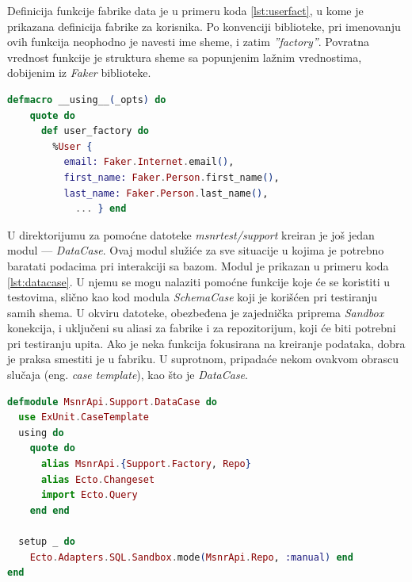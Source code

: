 \documentclass[12pt,oneside]{memoir}
\begin{document}
\par Definicija funkcije fabrike data je u primeru koda \ref{lst:userfact}, u kome je prikazana definicija fabrike za korisnika. Po konvenciji biblioteke, pri imenovanju ovih funkcija neophodno je navesti ime sheme, i zatim \emph{''{\textunderscore}factory''}. Povratna vrednost funkcije je struktura sheme sa popunjenim lažnim vrednostima, dobijenim iz \emph{Faker} biblioteke. \\

\begin{minipage}{\linewidth}
\begin{lstlisting}[language=elixir, basicstyle=\small, caption={Definicija modula \emph{UserFactory}},captionpos=b, label={lst:userfact}]
  defmacro __using__(_opts) do
    quote do
      def user_factory do
        %User {
          email: Faker.Internet.email(),
          first_name: Faker.Person.first_name(),
          last_name: Faker.Person.last_name(),
         	... } end
\end{lstlisting}
\end{minipage}

\par U direktorijumu za pomoćne datoteke \emph{msnr{\textunderscore}test/support} kreiran je još jedan modul --- \emph{DataCase}. Ovaj modul služiće za sve situacije u kojima je potrebno baratati podacima pri interakciji sa bazom. Modul je prikazan u primeru koda \ref{lst:datacase}. U njemu se mogu nalaziti pomoćne funkcije koje će se koristiti u testovima, slično kao kod modula \emph{SchemaCase} koji je korišćen pri testiranju samih shema. U okviru datoteke, obezbeđena je zajednička priprema \emph{Sandbox} konekcija, i uključeni su aliasi za fabrike i za repozitorijum, koji će biti potrebni pri testiranju upita. Ako je neka funkcija fokusirana na kreiranje podataka, dobra je praksa smestiti je u fabriku. U suprotnom, pripadaće nekom ovakvom obrascu slučaja (eng. \emph{case template}), kao što je \emph{DataCase}. \\ 

\begin{minipage}{\linewidth}
\begin{lstlisting}[language=elixir, basicstyle=\small, caption={Definicija modula \emph{DataCase}},captionpos=b, label={lst:datacase}]
defmodule MsnrApi.Support.DataCase do
  use ExUnit.CaseTemplate
  using do
    quote do
      alias MsnrApi.{Support.Factory, Repo}
      alias Ecto.Changeset
      import Ecto.Query
    end end

  setup _ do
    Ecto.Adapters.SQL.Sandbox.mode(MsnrApi.Repo, :manual) end
end
\end{lstlisting}
\end{minipage}
\end{document}
